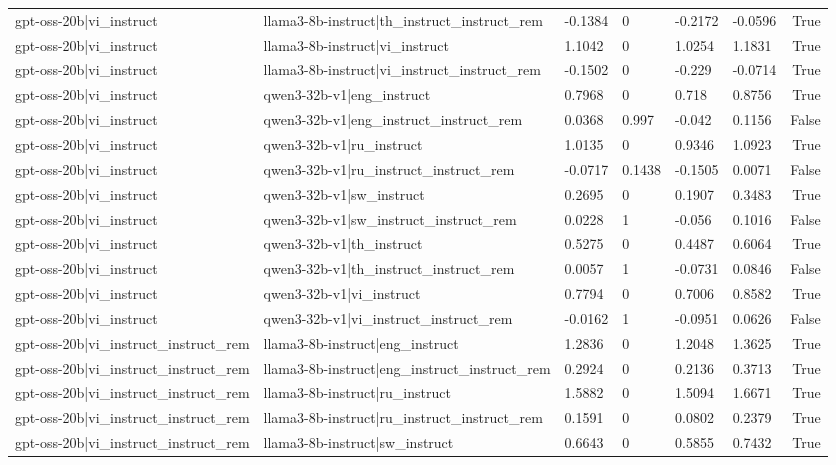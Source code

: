\begin{table}
\begin{tabular}{llllllr}
gpt-oss-20b|vi_instruct & llama3-8b-instruct|th_instruct_instruct_rem & -0.1384 & 0 & -0.2172 & -0.0596 & True \\
gpt-oss-20b|vi_instruct & llama3-8b-instruct|vi_instruct & 1.1042 & 0 & 1.0254 & 1.1831 & True \\
gpt-oss-20b|vi_instruct & llama3-8b-instruct|vi_instruct_instruct_rem & -0.1502 & 0 & -0.229 & -0.0714 & True \\
gpt-oss-20b|vi_instruct & qwen3-32b-v1|eng_instruct & 0.7968 & 0 & 0.718 & 0.8756 & True \\
gpt-oss-20b|vi_instruct & qwen3-32b-v1|eng_instruct_instruct_rem & 0.0368 & 0.997 & -0.042 & 0.1156 & False \\
gpt-oss-20b|vi_instruct & qwen3-32b-v1|ru_instruct & 1.0135 & 0 & 0.9346 & 1.0923 & True \\
gpt-oss-20b|vi_instruct & qwen3-32b-v1|ru_instruct_instruct_rem & -0.0717 & 0.1438 & -0.1505 & 0.0071 & False \\
gpt-oss-20b|vi_instruct & qwen3-32b-v1|sw_instruct & 0.2695 & 0 & 0.1907 & 0.3483 & True \\
gpt-oss-20b|vi_instruct & qwen3-32b-v1|sw_instruct_instruct_rem & 0.0228 & 1 & -0.056 & 0.1016 & False \\
gpt-oss-20b|vi_instruct & qwen3-32b-v1|th_instruct & 0.5275 & 0 & 0.4487 & 0.6064 & True \\
gpt-oss-20b|vi_instruct & qwen3-32b-v1|th_instruct_instruct_rem & 0.0057 & 1 & -0.0731 & 0.0846 & False \\
gpt-oss-20b|vi_instruct & qwen3-32b-v1|vi_instruct & 0.7794 & 0 & 0.7006 & 0.8582 & True \\
gpt-oss-20b|vi_instruct & qwen3-32b-v1|vi_instruct_instruct_rem & -0.0162 & 1 & -0.0951 & 0.0626 & False \\
gpt-oss-20b|vi_instruct_instruct_rem & llama3-8b-instruct|eng_instruct & 1.2836 & 0 & 1.2048 & 1.3625 & True \\
gpt-oss-20b|vi_instruct_instruct_rem & llama3-8b-instruct|eng_instruct_instruct_rem & 0.2924 & 0 & 0.2136 & 0.3713 & True \\
gpt-oss-20b|vi_instruct_instruct_rem & llama3-8b-instruct|ru_instruct & 1.5882 & 0 & 1.5094 & 1.6671 & True \\
gpt-oss-20b|vi_instruct_instruct_rem & llama3-8b-instruct|ru_instruct_instruct_rem & 0.1591 & 0 & 0.0802 & 0.2379 & True \\
gpt-oss-20b|vi_instruct_instruct_rem & llama3-8b-instruct|sw_instruct & 0.6643 & 0 & 0.5855 & 0.7432 & True \\

\end{tabular}
\end{table}
